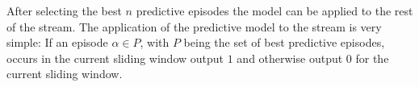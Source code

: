After selecting the best $n$ predictive episodes the model can be applied to the rest of the stream.
The application of the predictive model to the stream is very simple: If an episode $\alpha \in P$, with $P$ being the set of best predictive episodes, occurs in the current sliding window output $1$ and otherwise output $0$ for the current sliding window.


